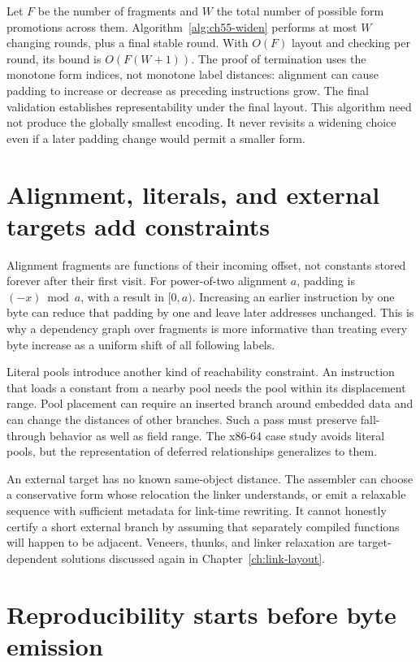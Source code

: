 Let $F$ be the number of fragments and $W$ the total number of possible form promotions across them.
Algorithm~\ref{alg:ch55-widen} performs at most $W$ changing rounds, plus a final stable round.
With $O(F)$ layout and checking per round, its bound is $O(F(W+1))$.
The proof of termination uses the monotone form indices, not monotone label distances: alignment can cause padding to increase or decrease as preceding instructions grow.
The final validation establishes representability under the final layout.
This algorithm need not produce the globally smallest encoding.
It never revisits a widening choice even if a later padding change would permit a smaller form.

\section{Alignment, literals, and external targets add constraints}
\label{sec:ch55-layout-constraints}

Alignment fragments are functions of their incoming offset, not constants stored forever after their first visit.
For power-of-two alignment $a$, padding is $(-x)\bmod a$, with a result in $[0,a)$.
Increasing an earlier instruction by one byte can reduce that padding by one and leave later addresses unchanged.
This is why a dependency graph over fragments is more informative than treating every byte increase as a uniform shift of all following labels.

Literal pools introduce another kind of reachability constraint.
An instruction that loads a constant from a nearby pool needs the pool within its displacement range.
Pool placement can require an inserted branch around embedded data and can change the distances of other branches.
Such a pass must preserve fall-through behavior as well as field range.
The x86-64 case study avoids literal pools, but the representation of deferred relationships generalizes to them.

An external target has no known same-object distance.
The assembler can choose a conservative form whose relocation the linker understands, or emit a relaxable sequence with sufficient metadata for link-time rewriting.
It cannot honestly certify a short external branch by assuming that separately compiled functions will happen to be adjacent.
Veneers, thunks, and linker relaxation are target-dependent solutions discussed again in Chapter~\ref{ch:link-layout}.

\section{Reproducibility starts before byte emission}
\label{sec:ch55-reproducibility}


